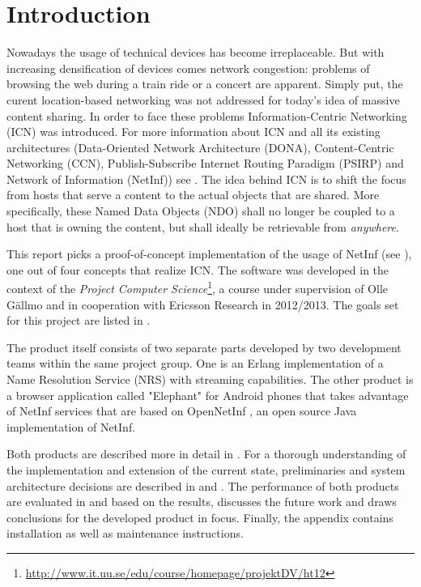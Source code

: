 \chapter{Introduction}

Nowadays the usage of technical devices has become irreplaceable. But with increasing
densification of devices comes network congestion: problems of
browsing the web during a train ride or a concert are apparent. Simply put, the curent
location-based networking was not addressed for today's idea of massive content sharing. 
In order to face these problems Information-Centric Networking (ICN) was introduced. For
more information about ICN and all its existing architectures (Data-Oriented Network Architecture (DONA),
Content-Centric Networking (CCN), Publish-Subscribe Internet Routing Paradigm (PSIRP) and Network of Information (NetInf)) 
see \cite{netinf}.
The idea behind ICN is to shift the focus from hosts that serve a content to the actual objects that
are shared. More specifically, these Named Data Objects (NDO) shall no longer be coupled
to a host that is owning the content, but shall ideally be retrievable from \textit{anywhere}.

This report picks a proof-of-concept implementation of the usage of NetInf
(see ), one out of four concepts that realize ICN. The software was
developed in the context of the 
\textit{Project Computer Science}\footnote{\url{http://www.it.uu.se/edu/course/homepage/projektDV/ht12}},
a course under supervision of Olle G\"{a}llmo and in cooperation with Ericsson Research \cite{ericsson}
in 2012/2013. The goals set for this project are listed in . 

The product itself consists of two separate parts developed by two development teams within the same project group. One is an Erlang \cite{erlang} implementation of a Name Resolution Service (NRS) with streaming capabilities.
The other product is a browser application called "Elephant" for Android \cite{android}  phones that takes advantage of NetInf services that
are based on OpenNetInf \cite{opennetinf}, an open source Java implementation of NetInf. 

Both products are described more in detail in . For a thorough understanding
of the implementation and extension of the current state, preliminaries and system architecture decisions are 
described in  and . 
The performance of both products are evaluated in  and based on the results,
 discusses the future work and draws conclusions for the developed product
in focus. Finally, the appendix contains installation as well as maintenance instructions.

